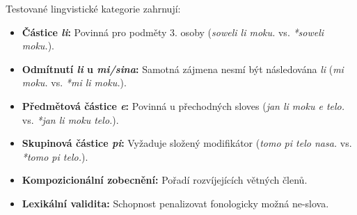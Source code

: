 Testované lingvistické kategorie zahrnují:
\begin{itemize}
    \item \textbf{Částice \textit{li}:} Povinná pro podměty 3. osoby (\textit{soweli li moku.} vs. \textit{*soweli moku.}).
    \item \textbf{Odmítnutí \textit{li} u \textit{mi/sina}:} Samotná zájmena nesmí být následována \textit{li} (\textit{mi moku.} vs. \textit{*mi li moku.}).
    \item \textbf{Předmětová částice \textit{e}:} Povinná u přechodných sloves (\textit{jan li moku e telo.} vs. \textit{*jan li moku telo.}).
    \item \textbf{Skupinová částice \textit{pi}:} Vyžaduje složený modifikátor (\textit{tomo pi telo nasa.} vs. \textit{*tomo pi telo.}).
    \item \textbf{Kompozicionální zobecnění:} Pořadí rozvíjejících větných členů.
    \item \textbf{Lexikální validita:} Schopnost penalizovat fonologicky možná ne-slova.
\end{itemize}
